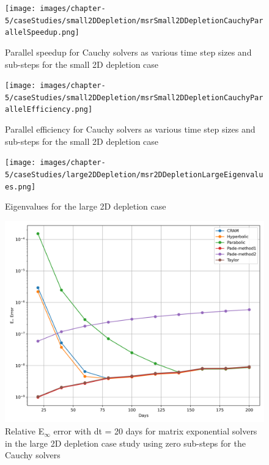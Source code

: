 \clearpage

\begin{figure}[p]
    \centering
    \texttt{[image: images/chapter-5/caseStudies/small2DDepletion/msrSmall2DDepletionCauchyParallelSpeedup.png]}
    \caption{Parallel speedup for Cauchy solvers as various time step sizes and sub-steps for the small 2D depletion case}
    \label{fig:small_2D_depletion_cauchy_speedup}
\end{figure}

\clearpage

\begin{figure}[p]
    \centering
    \texttt{[image: images/chapter-5/caseStudies/small2DDepletion/msrSmall2DDepletionCauchyParallelEfficiency.png]}
    \caption{Parallel efficiency for Cauchy solvers as various time step sizes and sub-steps for the small 2D depletion case}
    \label{fig:small_2D_depletion_cauchy_parallel_eff}
\end{figure}

\clearpage

\begin{figure}[p]
    \centering
    \texttt{[image: images/chapter-5/caseStudies/large2DDepletion/msr2DDepletionLargeEigenvalues.png]}
    \caption{Eigenvalues for the large 2D depletion case}
    \label{fig:large_2D_depletion_eigenvalues}
\end{figure}

\clearpage

\begin{figure}[p]
    \centering
    \includegraphics[width=5in]{images/chapter-5/caseStudies/large2DDepletion/msrLarge2DDepletionEinfErrorerrorSteps0.png}
    \caption{Relative E$_{\infty}$ error with dt = 20 days for matrix exponential solvers in the large 2D depletion case study using zero sub-steps for the Cauchy solvers}
    \label{fig:large_2D_depletion_Einf_steps0}
\end{figure}


